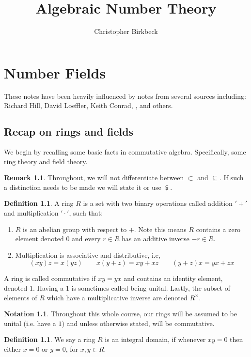 \documentclass[11pt,a4paper]{report}
\title{Algebraic Number Theory}
\author{Christopher Birkbeck}
\theoremstyle{plain}
\theoremstyle{definition}
\newtheorem{definition}[subsection]{Definition}
\theoremstyle{definition}
\newtheorem*{rmrk*}{Remark}
\newtheorem{nota}[subsection]{Notation}
\begin{document}
	\maketitle
	\tableofcontents
	
	
	
	
	\chapter{Number Fields}
	
	These notes have been heavily influenced by notes from several sources including: Richard Hill, David Loeffler, Keith Conrad, \cite{marcus},\cite{Samuel} and others.
	
	\section{Recap on rings and fields}
	We begin by recalling some basic facts in commutative algebra. Specifically, some ring theory and field theory.	
	
	
	\begin{rmrk*}
		Throughout, we will not differentiate between $\subset$ and $\subseteq$. If such a distinction needs to be made we will state it or use $\subsetneqq$. 
	\end{rmrk*}
	
	\begin{definition}
		A ring $R$ is a set with two binary operations called addition $'+'$ and multiplication $'\cdot'$, such that:
		
		\begin{enumerate}
			\item $R$ is an abelian group with respect to  $+$. Note this means $R$ contains a zero element denoted $0$ and every $r \in R$ has an additive inverse $-r \in R$.
			\item Multiplication is associative and distributive, i.e, \[(xy)z=x(yz) \qquad x(y+z)=xy+xz \qquad (y+z)x=yx+zx\]
		\end{enumerate}
		A ring is called commutative if $xy=yx$ and contains an identity element, denoted $1$. Having a $1$ is sometimes called being unital. Lastly, the subset of elements of $R$ which have a multiplicative inverse are denoted $R^\times$.
		
	\end{definition}
	
	
	
	
	\begin{nota}
		Throughout this whole course, our rings will be assumed to be unital (i.e. have a $1$) and unless otherwise stated, will be commutative.
	\end{nota}
	\begin{definition}
		We say a ring $R$ is an integral domain, if whenever $xy=0$ then either $x=0$ or $y=0$, for $x,y \in R$.
	\end{definition}
	
\end{document}
